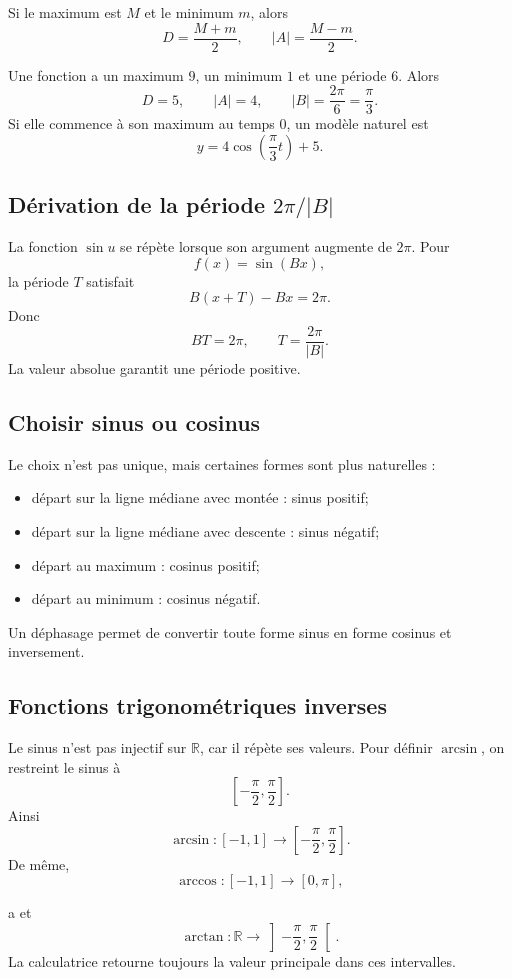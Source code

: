 \documentclass[12pt,a4paper,openany]{book}
\newcommand{\R}{\mathbb{R}}
\newcommand{\abs}[1]{\left\lvert #1\right\rvert}
\begin{document}
Si le maximum est $M$ et le minimum $m$, alors
\[
D=\frac{M+m}{2},
\qquad
\abs A=\frac{M-m}{2}.
\]

\begin{examplebox}
Une fonction a un maximum $9$, un minimum $1$ et une période $6$. Alors
\[
D=5,
\qquad \abs A=4,
\qquad \abs B=\frac{2\pi}{6}=\frac\pi3.
\]
Si elle commence à son maximum au temps $0$, un modèle naturel est
\[
y=4\cos\left(\frac\pi3t\right)+5.
\]
\end{examplebox}

\subsection{Dérivation de la période \texorpdfstring{$2\pi/\abs B$}{2 pi sur valeur absolue de B}}

La fonction $\sin u$ se répète lorsque son argument augmente de $2\pi$. Pour
\[
f(x)=\sin(Bx),
\]
la période $T$ satisfait
\[
B(x+T)-Bx=2\pi.
\]
Donc
\[
BT=2\pi,
\qquad
T=\frac{2\pi}{\abs B}.
\]
La valeur absolue garantit une période positive.

\subsection{Choisir sinus ou cosinus}

Le choix n'est pas unique, mais certaines formes sont plus naturelles :
\begin{itemize}
\item départ sur la ligne médiane avec montée : sinus positif;
\item départ sur la ligne médiane avec descente : sinus négatif;
\item départ au maximum : cosinus positif;
\item départ au minimum : cosinus négatif.
\end{itemize}
Un déphasage permet de convertir toute forme sinus en forme cosinus et inversement.

\subsection{Fonctions trigonométriques inverses}

Le sinus n'est pas injectif sur $\R$, car il répète ses valeurs. Pour définir $\arcsin$, on restreint le sinus à
\[
\left[-\frac\pi2,\frac\pi2\right].
\]
Ainsi
\[
\arcsin:[-1,1]\to\left[-\frac\pi2,\frac\pi2\right].
\]
De même,
\[
\arccos:[-1,1]\to[0,\pi],
\]

a et
\[
\arctan:\R\to\left]-\frac\pi2,\frac\pi2\right[.
\]
La calculatrice retourne toujours la valeur principale dans ces intervalles.
\end{document}

